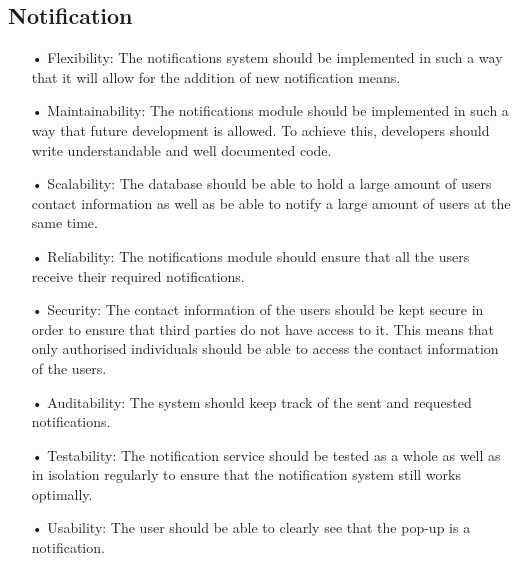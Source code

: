 \documentclass[runningheads,a4paper]{article}
\begin{document}
\subsection{Notification}
\begin{enumerate}

\item[•]Flexibility: The notifications system should be implemented in such a way that it will allow for the addition of new notification means.

\item[•]Maintainability: The notifications module should be implemented in such a way that future development is allowed. To achieve this, developers should write understandable and well documented code.
 
\item[•]Scalability: The database should be able to hold a large amount of users contact information as well as be able to notify a large amount of users at the same time.

\item[•]Reliability: The notifications module should ensure that all the users receive their required notifications.

\item[•]Security: The contact information of the users should be kept secure in order to ensure that third parties do not have access to it. This means that only authorised individuals should be able to access the contact information of the users.

\item[•]Auditability: The system should keep track of the sent and requested notifications.

\item[•]Testability: The notification service should be tested as a whole as well as in isolation regularly to ensure that the notification system still works optimally.

\item[•]Usability: The user should be able to clearly see that the pop-up is a notification.


\end{enumerate}
\end{document}
